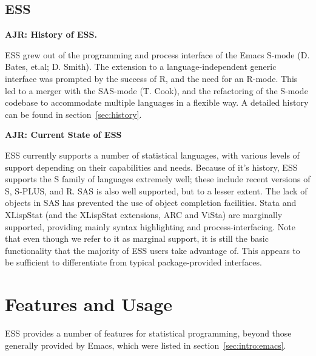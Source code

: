 \documentclass{article}
\newcommand*{\Splus}{\textsc{S-PLUS}}
\begin{document}
\subsection{ESS}
\label{sec:intro:ESS}

\textbf{AJR: History of ESS.}

ESS grew out of the programming and process interface of the Emacs
S-mode (D. Bates, et.al; D. Smith).  The extension to a
language-independent generic interface was prompted by the success of
R, and the need for an R-mode.  This led to a merger with the SAS-mode
(T. Cook), and the refactoring of the S-mode codebase to accommodate
multiple languages in a flexible way.  A detailed  history can be
found in section~\ref{sec:history}.

\textbf{AJR: Current State of ESS}

ESS currently supports a number of statistical languages, with various
levels of support depending on their capabilities and needs.  Because
of it's history, ESS supports the S family of languages extremely
well; these include recent versions of S, \Splus, and R.  SAS is also
well supported, but to a lesser extent.  The lack of objects in SAS
has prevented the use of object completion facilities.  Stata and
XLispStat (and the XLispStat extensions, ARC and ViSta) are marginally
supported, providing mainly syntax highlighting and
process-interfacing.  Note that even though we refer to it as marginal
support, it is still the basic functionality that the majority of ESS
users take advantage of.  This appears to be sufficient to
differentiate from typical package-provided interfaces.

\section{Features and Usage}
\label{sec:basic}

ESS provides a number of features for statistical programming, beyond
those generally provided by Emacs, which were listed in
section~\ref{sec:intro:emacs}.
\end{document}
